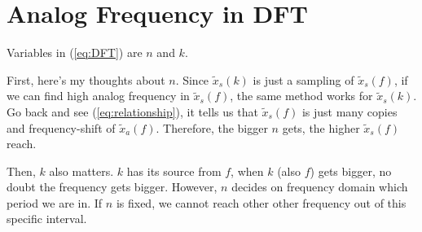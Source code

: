 \documentclass{article}
\begin{document}
\section{Analog Frequency in DFT}
Variables in (\ref{eq:DFT}) are $n$ and $k$.

First, here's my thoughts about $n$. Since $\widetilde{x}_s(k)$ is just a sampling of $\widetilde{x}_s(f)$, if we can find high analog frequency in $\widetilde{x}_s(f)$, the same method works for $\widetilde{x}_s(k)$. Go back and see (\ref{eq:relationship}), it tells us that $\widetilde{x}_s(f)$ is just many copies and frequency-shift of $\widetilde{x}_a(f)$. Therefore, the bigger $n$ gets, the higher $\widetilde{x}_s(f)$ reach. 

Then, $k$ also matters. $k$ has its source from $f$, when $k$ (also $f$) gets bigger, no doubt the frequency gets bigger. However, $n$ decides on frequency domain which period we are in. If $n$ is fixed, we cannot reach other other frequency out of this specific interval.




% 
% 


\end{document}
